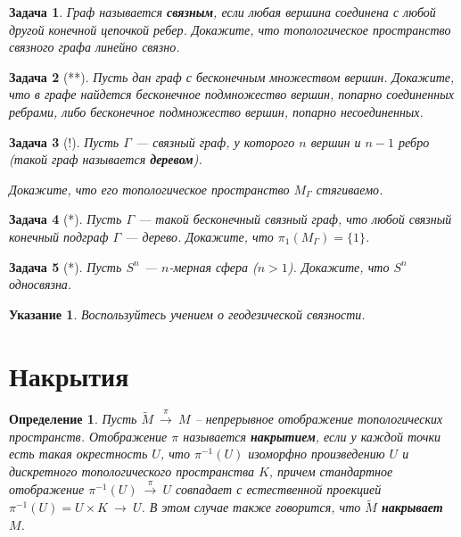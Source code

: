 \documentclass[12pt]{book}
\newcommand{\subs}{\section}
\newcommand{\arrow}{{\:\longrightarrow\:}}
\theoremstyle{upshape}
\newtheorem{zadacha}{Задача}[chapter]
\theoremstyle{generic}
\newtheorem{opredelenie}[teorema]{Определение}
\theoremstyle{upshapenonumber}
\newtheorem{ukazanie}{Указание}[section]
\newcommand{\следствие}{%
     \refstepcounter{teorema}
     {\noindent\bf Следствие \thechapter.\arabic{teorema}:\ }}
\newcommand{\пример}{%
     \refstepcounter{teorema}
     {\noindent\bf Пример \thechapter.\arabic{teorema}:\ }}
\newcommand{\лемма}{%
     \refstepcounter{teorema}
     {\noindent\bf Лемма \thechapter.\arabic{teorema}:\ }}
\newcommand{\теорема}{%
     \refstepcounter{teorema}
     {\noindent\bf Теорема \thechapter.\arabic{teorema}:\ }}
\newcommand{\утверждение}{%
     \refstepcounter{teorema}
     {\noindent\bf Утверждение \thechapter.\arabic{teorema}:\ }}
\begin{document}
{\begin{zadacha}
Граф называется {\bf связным}, если любая вершина соединена
с любой другой конечной цепочкой ребер. Докажите, что топологическое 
пространство связного графа линейно связно. 
\end{zadacha}

\begin{zadacha}[**]
Пусть дан граф  с бесконечным множеством вершин.
Докажите, что в графе найдется бесконечное подмножество
вершин, попарно соединенных ребрами, либо бесконечное подмножество
вершин, попарно несоединенных.
\end{zadacha}

\begin{zadacha}[!]
Пусть $\Gamma$ --- связный граф, у которого
$n$ вершин и $n-1$ ребро (такой граф называется {\bf деревом}).
\begin{center}
\end{center}
Докажите, что его топологическое пространство $M_\Gamma$ стягиваемо.
\end{zadacha}

\begin{zadacha}[*]
Пусть $\Gamma$ --- такой бесконечный  связный граф, что любой связный конечный
подграф $\Gamma$ --- дерево. Докажите, что $\pi_1(M_\Gamma)=\{1\}$.
\end{zadacha}

\begin{zadacha}[*]
Пусть $S^n$ --- $n$-мерная сфера ($n> 1$). Докажите, что
$S^n$ односвязна.
\end{zadacha}

\begin{ukazanie}
Воспользуйтесь учением о геодезической связности.
\end{ukazanie}

\subs{Накрытия}

\begin{opredelenie}
Пусть $\tilde M \stackrel \pi \arrow M$ --
непрерывное отображение топологических пространств.
Отображение $\pi$ называется {\bf накрытием}, если
у каждой точки есть такая окрестность $U$,
что $\pi^{-1}(U)$ изоморфно произведению
$U$ и дискретного топологического пространства 
$K$, причем стандартное отображение
$\pi^{-1}(U)\stackrel \pi \arrow U$
совпадает с естественной проекцией
$\pi^{-1}(U) = U \times K \arrow U$.
В этом случае также говорится, что
$\tilde M$ {\bf накрывает} $M$.
\end{opredelenie}

}
\end{document}
